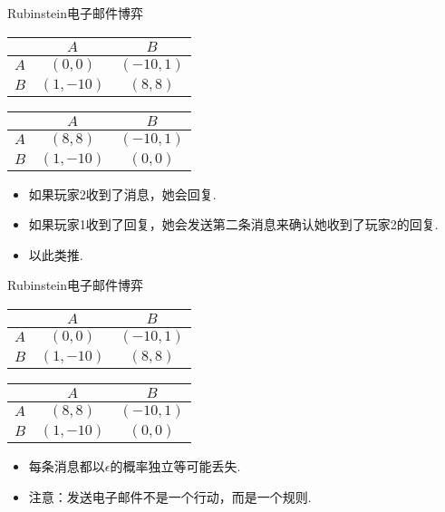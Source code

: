 {Rubinstein电子邮件博弈}
\begin{table}[ht]
    \centering
\begin{tabular}{c|cc}
&$A$ & $B$ \\
\hline
$A$ & $(0, 0)$ & $(-10, 1)$ \\
$B$ & $(1, -10)$ & $(8, 8)$ \\
\end{tabular}
\qquad
\begin{tabular}{c|cc}
&$A$ & $B$ \\
\hline
$A$ & $(8, 8)$ & $(-10, 1)$ \\
$B$ & $(1, -10)$ & $(0, 0)$ \\
\end{tabular}
\end{table}
\begin{itemize}
\item 如果玩家2收到了消息，她会回复.  
\item 如果玩家1收到了回复，她会发送第二条消息来确认她收到了玩家2的回复.  
\item 以此类推.  
\end{itemize}


{Rubinstein电子邮件博弈}
\begin{table}[ht]
    \centering
\begin{tabular}{c|cc}
&$A$ & $B$ \\
\hline
$A$ & $(0, 0)$ & $(-10, 1)$ \\
$B$ & $(1, -10)$ & $(8, 8)$ \\
\end{tabular}
\qquad
\begin{tabular}{c|cc}
&$A$ & $B$ \\
\hline
$A$ & $(8, 8)$ & $(-10, 1)$ \\
$B$ & $(1, -10)$ & $(0, 0)$ \\
\end{tabular}
\end{table}
\begin{itemize}
\item 每条消息都以$\epsilon$的概率独立等可能丢失.  
\item 注意：发送电子邮件不是一个行动，而是一个规则.  
\end{itemize}


